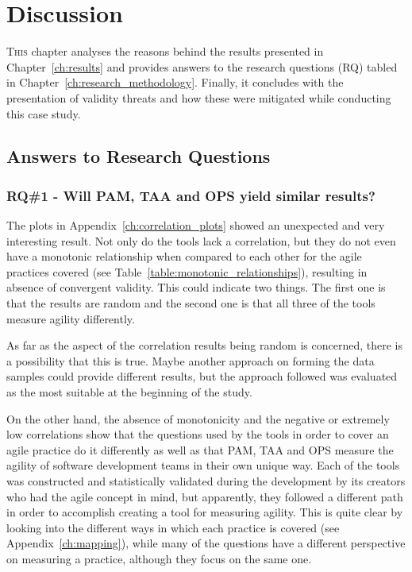 \chapter{Discussion}
\label{ch:discussion}
\lettrine[lines=4, loversize=-0.1, lraise=0.1]{T}{his} chapter analyses the reasons behind the results presented in Chapter~\ref{ch:results} and provides answers to the research questions (RQ) tabled in Chapter~\ref{ch:research_methodology}. Finally, it concludes with the presentation of validity threats and how these were mitigated while conducting this case study.

\section{Answers to Research Questions}

\subsection{RQ\#1 - Will PAM, TAA and OPS yield similar results?}

The plots in Appendix~\ref{ch:correlation_plots} showed an unexpected and very interesting result. Not only do the tools lack a correlation, but they do not even have a monotonic relationship when compared to each other for the agile practices covered (see Table~\ref{table:monotonic_relationships}), resulting in absence of convergent validity. This could indicate two things. The first one is that the results are random and the second one is that all three of the tools measure agility differently. 

As far as the aspect of the correlation results being random is concerned, there is a possibility that this is true. Maybe another approach on forming the data samples could provide different results, but the approach followed was evaluated as the most suitable at the beginning of the study.

On the other hand, the absence of monotonicity and the negative or extremely low correlations show that the questions used by the tools in order to cover an agile practice do it differently as well as that \ac{PAM}, \ac{TAA} and \ac{OPS} measure the agility of software development teams in their own unique way. Each of the tools was constructed and statistically validated during the development by its creators who had the agile concept in mind, but apparently, they followed a different path in order to accomplish creating a tool for measuring agility. This is quite clear by looking into the different ways in which each practice is covered (see Appendix~\ref{ch:mapping}), while many of the questions have a different perspective on measuring a practice, although they focus on the same one. 

